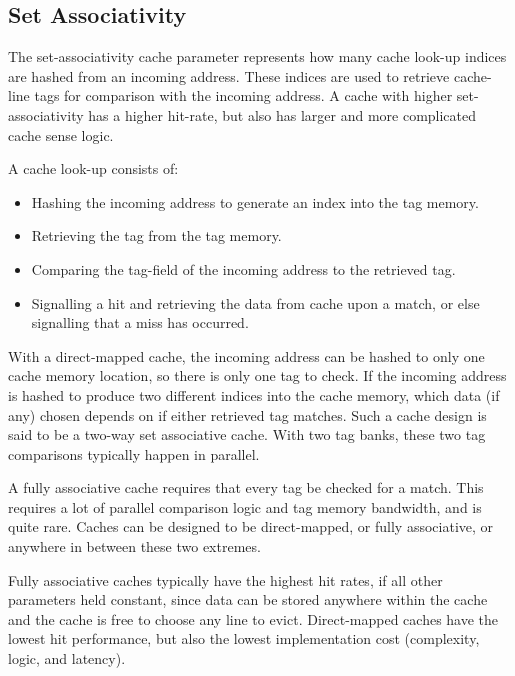 \subsection{Set Associativity}
\label{CACHE_Associativity}
The set-associativity cache parameter represents how many cache look-up indices
are hashed from an incoming address. These indices are used to retrieve
cache-line tags for comparison with the incoming address. A cache with higher
set-associativity has a higher hit-rate, but also has larger and more complicated
cache sense logic.

A cache look-up consists of:
\begin{itemize}
  \item Hashing the incoming address to generate an index into the tag memory.
  \item Retrieving the tag from the tag memory.
  \item Comparing the tag-field of the incoming address to the retrieved tag.
  \item Signalling a hit and retrieving the data from cache upon a match, or
  else signalling that a miss has occurred.
\end{itemize}

With a direct-mapped cache, the incoming address can be hashed to only one
cache memory location, so there is only one tag to check. If the incoming
address is hashed to produce two different indices into the cache memory,
which data (if any) chosen depends on if either retrieved tag matches. Such a
cache design is said to be a two-way set associative cache. With two tag
banks, these two tag comparisons typically happen in parallel\cite{Comp_Arch}.

A fully associative cache requires that every tag be checked for a match. This
requires a lot of parallel comparison logic and tag memory bandwidth, and is
quite rare\cite{Comp_Arch}. Caches can be designed to be direct-mapped, or fully
associative, or anywhere in between these two extremes.

Fully associative caches typically have the highest hit
rates\cite{parhami2005cam}, if all other parameters held constant, since data can
be stored anywhere within the cache and the cache is free to choose any line to
evict. Direct-mapped caches have the lowest hit performance, but also the lowest
implementation cost (complexity, logic, and latency)\cite{Comp_Arch,
parhami2005cam}.

